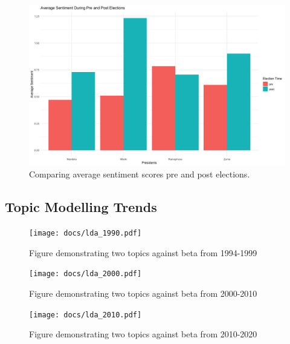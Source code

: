 \documentclass[
  letterpaper,
  DIV=11,
  numbers=noendperiod]{scrartcl}
\begin{document}
\begin{figure}

{\centering \includegraphics{docs/Pre_post_elections.png}

}

\caption{Comparing average sentiment scores pre and post elections.}

\end{figure}

\hypertarget{topic-modelling-trends}{%
\subsection{Topic Modelling Trends}\label{topic-modelling-trends}}

\begin{figure}

{\centering \texttt{[image: docs/lda\_1990.pdf]}

}

\caption{Figure demonstrating two topics against beta from 1994-1999}

\end{figure}

\begin{figure}

{\centering \texttt{[image: docs/lda\_2000.pdf]}

}

\caption{Figure demonstrating two topics against beta from 2000-2010}

\end{figure}

\begin{figure}

{\centering \texttt{[image: docs/lda\_2010.pdf]}

}

\caption{Figure demonstrating two topics against beta from 2010-2020}

\end{figure}
\end{document}
